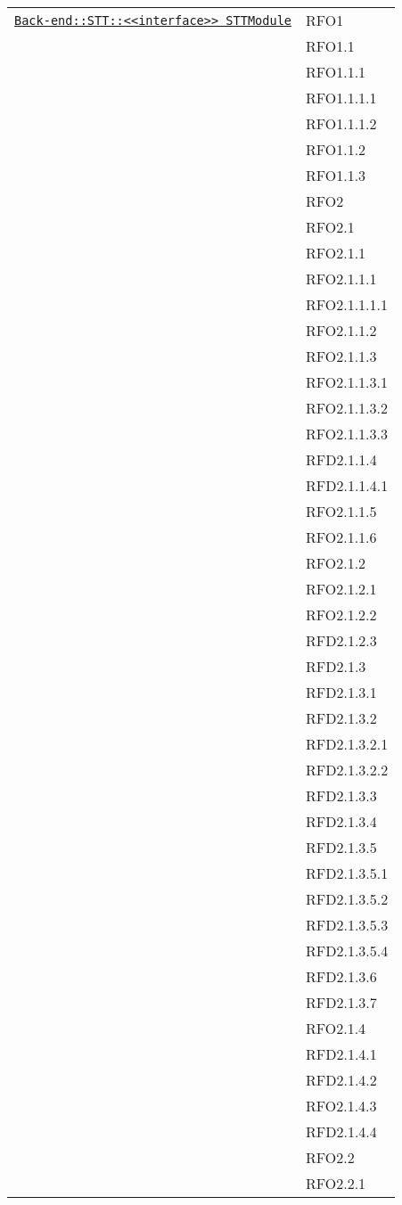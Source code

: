 \begin{longtable}{|>{\centering}m{10cm}|m{3cm}<{\centering}|}
\hyperref[Back-end::STT::<<interface>> STTModule]{\texttt{Back-end::STT::<<interface>> STTModule}} & RFO1\\
& RFO1.1\\
& RFO1.1.1\\
& RFO1.1.1.1\\
& RFO1.1.1.2\\
& RFO1.1.2\\
& RFO1.1.3\\
& RFO2\\
& RFO2.1\\
& RFO2.1.1\\
& RFO2.1.1.1\\
& RFO2.1.1.1.1\\
& RFO2.1.1.2\\
& RFO2.1.1.3\\
& RFO2.1.1.3.1\\
& RFO2.1.1.3.2\\
& RFO2.1.1.3.3\\
& RFD2.1.1.4\\
& RFD2.1.1.4.1\\
& RFO2.1.1.5\\
& RFO2.1.1.6\\
& RFO2.1.2\\
& RFO2.1.2.1\\
& RFO2.1.2.2\\
& RFD2.1.2.3\\
& RFD2.1.3\\
& RFD2.1.3.1\\
& RFD2.1.3.2\\
& RFD2.1.3.2.1\\
& RFD2.1.3.2.2\\
& RFD2.1.3.3\\
& RFD2.1.3.4\\
& RFD2.1.3.5\\
& RFD2.1.3.5.1\\
& RFD2.1.3.5.2\\
& RFD2.1.3.5.3\\
& RFD2.1.3.5.4\\
& RFD2.1.3.6\\
& RFD2.1.3.7\\
& RFO2.1.4\\
& RFD2.1.4.1\\
& RFD2.1.4.2\\
& RFO2.1.4.3\\
& RFD2.1.4.4\\
& RFO2.2\\
& RFO2.2.1\\

\end{longtable}
